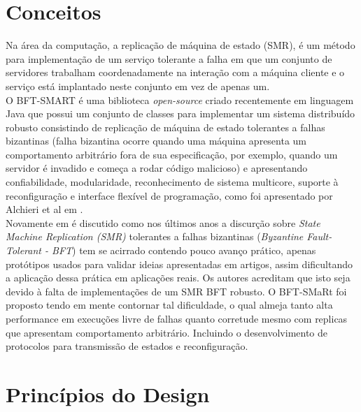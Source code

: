 	\section{Conceitos}
	Na área da computação, a  replicação de máquina de estado (SMR), é um método para implementação de um serviço tolerante a falha em que um conjunto de servidores trabalham coordenadamente na interação com a máquina cliente e o serviço está implantado neste conjunto em vez de  apenas um. \\
	
	O BFT-SMART é uma biblioteca \textit{open-source} criado recentemente em linguagem Java que possui um conjunto de classes para implementar um sistema distribuído robusto consistindo de replicação de máquina de estado tolerantes a falhas bizantinas (falha bizantina ocorre quando uma máquina apresenta um comportamento arbitrário fora de sua especificação, por exemplo, quando um servidor é invadido e começa a rodar código malicioso) e apresentando confiabilidade, modularidade, reconhecimento de sistema multicore, suporte à reconfiguração e interface flexível de programação, como foi apresentado por Alchieri et al em \cite{bessani3}. \\
	
	Novamente em \cite{bessani3} é discutido como nos últimos anos a discurção sobre \textit{State Machine Replication (SMR)} tolerantes a falhas bizantinas (\textit{Byzantine Fault-Tolerant - BFT}) tem se acirrado contendo pouco avanço prático, apenas protótipos usados para validar ideias apresentadas em artigos, assim dificultando a aplicação dessa prática em aplicações reais. Os autores acreditam que isto seja devido à falta de implementações de um SMR BFT robusto. O BFT-SMaRt foi proposto tendo em mente contornar tal dificuldade, o qual almeja tanto alta performance em execuções livre de falhas quanto corretude mesmo com replicas que apresentam comportamento arbitrário. Incluindo o desenvolvimento de protocolos para transmissão de estados e reconfiguração. \\
	
	\section{Princípios do Design}
	
